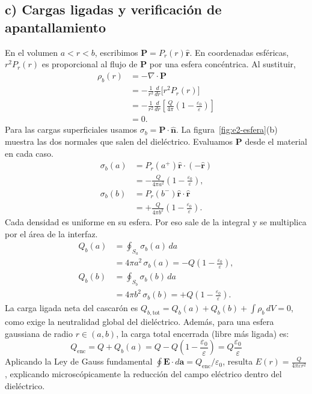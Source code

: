 \documentclass[11pt]{article}
\begin{document}
\subsection*{c) Cargas ligadas y verificación de apantallamiento}
En el volumen $a<r<b$, escribimos $\mathbf P=P_r(r)\hat{\mathbf r}$.
En coordenadas esféricas, $r^2P_r(r)$ es proporcional al flujo
de $\mathbf P$ por una esfera concéntrica. Al sustituir,
\begin{align*}
    \rho_b(r)
    &=-\nabla\cdot\mathbf P\\
    &=-\frac1{r^2}\frac{d}{dr}\bigl[r^2P_r(r)\bigr]\\
    &=-\frac1{r^2}\frac{d}{dr}
       \left[\frac{Q}{4\pi}\left(1-\frac{\varepsilon_0}{\varepsilon}\right)\right]\\
    &=0.
\end{align*}
Para las cargas superficiales usamos $\sigma_b=\mathbf P\cdot\hat{\mathbf n}$.
La figura~\ref{fig:e2-esfera}(b) muestra las dos normales que salen
del dieléctrico. Evaluamos $\mathbf P$ desde el material en cada caso.
\begin{align*}
    \sigma_b(a)
    &=P_r(a^+)\hat{\mathbf r}\cdot(-\hat{\mathbf r})\\
    &=-\frac{Q}{4\pi a^2}\left(1-\frac{\varepsilon_0}{\varepsilon}\right),\\[4pt]
    \sigma_b(b)
    &=P_r(b^-)\hat{\mathbf r}\cdot\hat{\mathbf r}\\
    &=+\frac{Q}{4\pi b^2}\left(1-\frac{\varepsilon_0}{\varepsilon}\right).
\end{align*}
Cada densidad es uniforme en su esfera. Por eso sale de la integral
y se multiplica por el área de la interfaz.
\begin{align*}
    Q_b(a)
    &=\oint_{S_a}\sigma_b(a)\,da\\
    &=4\pi a^2\,\sigma_b(a)=-Q\left(1-\frac{\varepsilon_0}{\varepsilon}\right),\\[4pt]
    Q_b(b)
    &=\oint_{S_b}\sigma_b(b)\,da\\
    &=4\pi b^2\,\sigma_b(b)=+Q\left(1-\frac{\varepsilon_0}{\varepsilon}\right).
\end{align*}
La carga ligada neta del cascarón es $Q_{b,\text{tot}} = Q_b(a) + Q_b(b) + \int \rho_b\, dV = 0$, como exige la neutralidad global del dieléctrico. Además, para una esfera gaussiana de radio $r \in (a, b)$, la carga total encerrada (libre más ligada) es:
\begin{equation}
    Q_{\text{enc}} = Q + Q_b(a) = Q - Q\left( 1 - \frac{\varepsilon_0}{\varepsilon} \right) = Q \frac{\varepsilon_0}{\varepsilon}
\end{equation}
Aplicando la Ley de Gauss fundamental $\oint \mathbf{E}\cdot d\mathbf{a} = Q_{\text{enc}}/\varepsilon_0$, resulta $E(r) = \frac{Q}{4\pi \varepsilon r^2}$, explicando microscópicamente la reducción del campo eléctrico dentro del dieléctrico.
\end{document}

